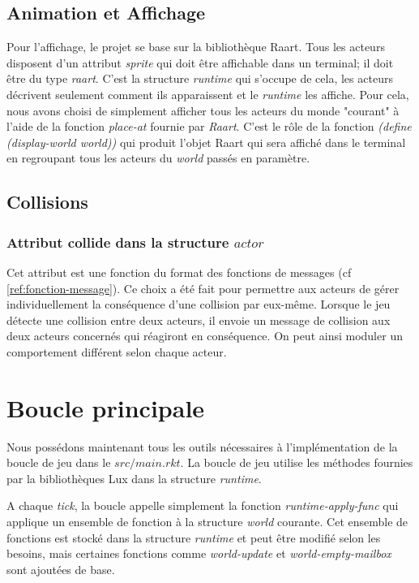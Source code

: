 \documentclass{article}
\begin{document}
\subsection{Animation et Affichage}

Pour l'affichage, le projet se base sur la bibliothèque Raart. Tous les acteurs disposent d'un attribut \textit{sprite} qui doit être affichable dans un terminal; il doit être du type \textit{raart}. C'est la structure \textit{runtime} qui s'occupe de cela, les acteurs décrivent seulement comment ils apparaissent et le \textit{runtime} les affiche. Pour cela, nous avons choisi de simplement afficher tous les acteurs du monde "courant" à l'aide de la fonction \textit{place-at} fournie par \textit{Raart}. C'est le rôle de la fonction \textit{(define (display-world world))} qui produit l'objet Raart qui sera affiché dans le terminal en regroupant tous les acteurs du \textit{world} passés en paramètre. 

\subsection{Collisions}

\subsubsection{Attribut collide dans la structure $actor$}

Cet attribut est une fonction du format des fonctions de messages (cf \ref{ref:fonction-message}). Ce choix a été fait pour permettre aux acteurs de gérer individuellement la conséquence d'une collision par eux-même. Lorsque le jeu détecte une collision entre deux acteurs, il envoie un message de collision aux deux acteurs concernés qui réagiront en conséquence.  On peut ainsi moduler un comportement différent selon chaque acteur.

\newpage
\section{Boucle principale}
Nous possédons maintenant tous les outils nécessaires à l'implémentation de la boucle de jeu dans le $src/main.rkt$. La boucle de jeu utilise les méthodes fournies par la bibliothèques Lux dans la structure \textit{runtime}.

A chaque \textit{tick}, la boucle appelle simplement la fonction \textit{runtime-apply-func} qui applique un ensemble de fonction à la structure \textit{world} courante. Cet ensemble de fonctions est stocké dans la structure \textit{runtime} et peut être modifié selon les besoins, mais certaines fonctions comme \textit{world-update} et \textit{world-empty-mailbox} sont ajoutées de base.
\end{document}
